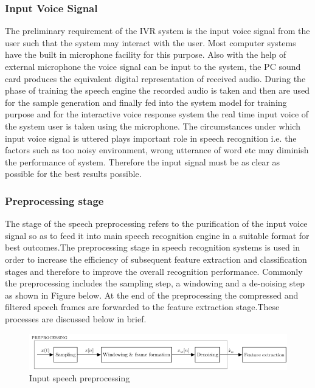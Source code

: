 \subsubsection{Input Voice Signal}
The preliminary requirement of the IVR system is the input voice signal from the user such that the system may interact with the user. Most computer systems have the built in microphone facility for this purpose. Also with the help of external microphone the voice signal can be input to the system, the PC sound card produces the equivalent digital representation of received audio. During the phase of training the speech engine the recorded audio is taken and then are used for the sample generation and finally fed into the system model for training purpose and for the interactive voice response system the real time input voice of the system user is taken using the microphone. The circumstances under which input voice signal is uttered plays important role in speech recognition i.e. the factors such as too noisy environment, wrong utterance of word etc may diminish the performance of system. Therefore the input signal must be as clear as possible for the best results possible.

\subsubsection{Preprocessing stage}
The stage of the speech preprocessing refers to the purification of the input voice signal so as to feed it into main speech recognition engine in a suitable format for best outcomes.The preprocessing stage in speech recognition systems is used in order to increase the efficiency of subsequent feature extraction and classification stages and therefore to improve the overall recognition performance. Commonly the preprocessing includes the sampling step, a windowing and a de-noising step as shown in Figure below. At the end of the preprocessing the compressed and filtered speech frames are forwarded to the feature extraction stage.These processes are discussed below in brief.
\begin{figure}
	\begin{center}
		\includegraphics[scale=0.8]{images/prepro.png}
		\caption{Input speech preprocessing}
	\end{center}
\end{figure}

